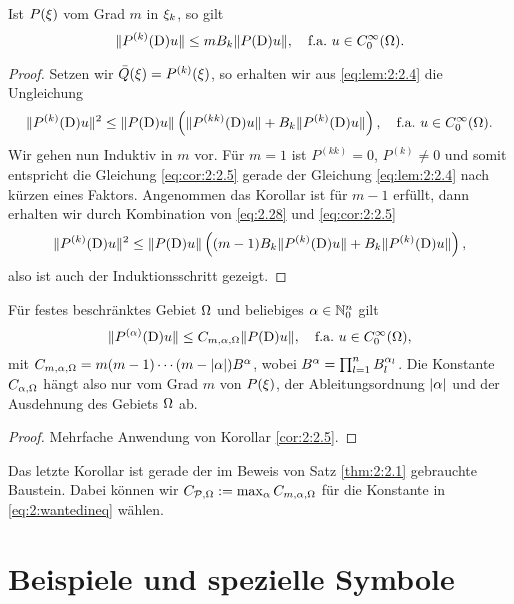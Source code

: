\begin{cor}\label{cor:2:2.5}
Ist $P(\xi)$ vom Grad $m$ in $\xi_k$, so gilt
\begin{equation}\label{eq:cor:2:2.5}
\lVert P^{(k)}(\mathrm D)u\rVert\leq mB_k\lVert P(\mathrm D)u\rVert,
\quad\text{f.a.}~u\in C^\infty_0(\Omega).
\end{equation}
\end{cor}
\begin{proof}
Setzen wir $\bar{Q}(\xi)=P^{(k)}(\xi)$, so erhalten wir aus \eqref{eq:lem:2:2.4} die Ungleichung
\begin{equation}\label{eq:2.28}
\lVert P^{(k)}(\mathrm D)u\rVert^2\leq\lVert P(\mathrm D)u\rVert\left(\lVert P^{(kk)}(\mathrm D)u\rVert+B_k\lVert P^{(k)}(\mathrm D)u\rVert\right),
\quad\text{f.a.}~u\in C^\infty_0(\Omega).
\end{equation}
Wir gehen nun Induktiv in $m$ vor.
Für $m=1$ ist $P^{(kk)}=0$, $P^{(k)}\neq0$ und somit entspricht die Gleichung \eqref{eq:cor:2:2.5}
gerade der Gleichung \eqref{eq:lem:2:2.4} nach kürzen eines Faktors.
Angenommen das Korollar ist für $m-1$ erfüllt,
dann erhalten wir durch Kombination von \eqref{eq:2.28} und \eqref{eq:cor:2:2.5}
\begin{equation}
\lVert P^{(k)}(\mathrm D)u\rVert^2\leq\lVert P(\mathrm D)u\rVert\left((m-1)B_k\lVert P^{(k)}(\mathrm D)u\rVert+B_k\lVert P^{(k)}(\mathrm D)u\rVert\right),
\end{equation}
also ist auch der Induktionsschritt gezeigt.
\end{proof}

\begin{cor}\label{cor:2:2.6}
Für festes beschränktes Gebiet $\Omega$ und beliebiges $\alpha\in\mathbb N^n_0$ gilt
\begin{equation}
\lVert P^{(\alpha)}(\mathrm D)u\rVert\leq C_{m,\alpha,\Omega}\lVert P(\mathrm D)u\rVert,
\quad\text{f.a.}~u\in C^\infty_0(\Omega),
\end{equation}
mit $C_{m,\alpha,\Omega}=m(m-1)\cdots(m-\lvert\alpha\rvert)B^\alpha$, wobei $B^\alpha=\prod_{l=1}^n B^{\alpha_l}_l$.
Die Konstante $C_{\alpha,\Omega}$ hängt also nur vom Grad $m$ von $P(\xi)$,
der Ableitungsordnung $\lvert\alpha\rvert$ und der Ausdehnung des Gebiets $\Omega$ ab.
\end{cor}

\begin{proof}
Mehrfache Anwendung von Korollar \ref{cor:2:2.5}.
\end{proof}

Das letzte Korollar ist gerade der im Beweis
von Satz \ref{thm:2:2.1} gebrauchte Baustein.
Dabei können wir $C_{\mathcal P,\Omega}:=\max_\alpha C_{m,\alpha,\Omega}$
für die Konstante in \eqref{eq:2:wantedineq} wählen.

\section{Beispiele und spezielle Symbole}

